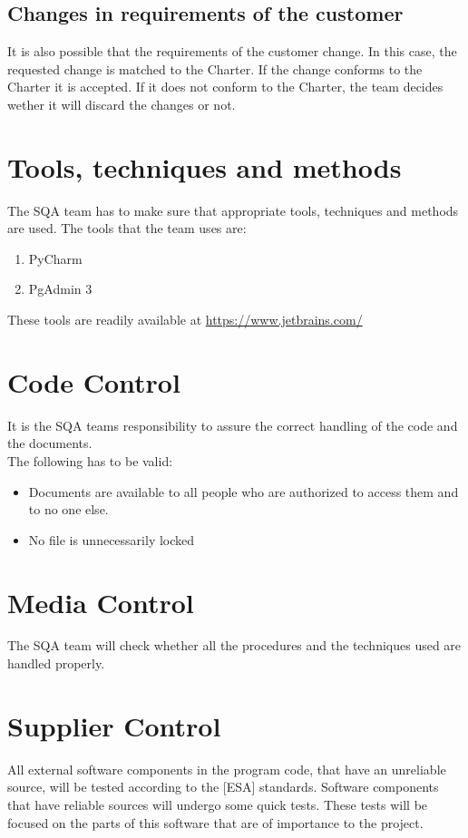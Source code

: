 \documentclass{report}
\begin{document}
\subsection{Changes in requirements of the customer}
It is also possible that the requirements of the customer change. In this case, the requested change is matched to the Charter. If the change conforms to the Charter it is accepted. If it does not conform to the Charter, the team decides wether it will discard the changes or not.

\section{Tools, techniques and methods}
The SQA team has to make sure that appropriate tools, techniques and methods are used. The tools that the team uses are:
\begin{enumerate}
\item PyCharm
\item PgAdmin 3
\end{enumerate}
These tools are readily available at \url {https://www.jetbrains.com/}

\section{Code Control}
It is the SQA teams responsibility to assure the correct handling of the code and the documents.\\
The following has to be valid:
\begin{itemize}
\item Documents are available to all people who are authorized to access them and to no one else.
\item No file is unnecessarily locked
\end{itemize}

\section{Media Control}
The SQA team will check whether all the procedures and the techniques used are handled properly.

\section{Supplier Control}
All external software components in the program code, that have an unreliable source, will be tested according to the [ESA] standards. Software components that  have reliable sources will undergo some quick tests. These tests will be focused on the parts of this software that are of importance to the project.
\end{document}
